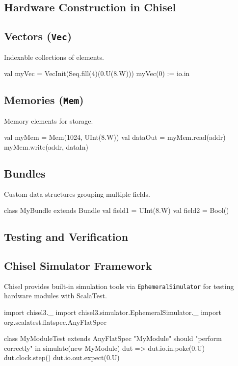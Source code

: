 \subsection{Hardware Construction in Chisel}

\subsection{Vectors (\texttt{Vec})}
Indexable collections of elements.
\begin{chiselcode}
val myVec = VecInit(Seq.fill(4)(0.U(8.W)))
myVec(0) := io.in
\end{chiselcode}

\subsection{Memories (\texttt{Mem})}
Memory elements for storage.
\begin{chiselcode}
val myMem = Mem(1024, UInt(8.W))
val dataOut = myMem.read(addr)
myMem.write(addr, dataIn)
\end{chiselcode}

\subsection{Bundles}
Custom data structures grouping multiple fields.
\begin{chiselcode}
class MyBundle extends Bundle {
  val field1 = UInt(8.W)
  val field2 = Bool()
}
\end{chiselcode}

\subsection{Testing and Verification}
\subsection{Chisel Simulator Framework}
Chisel provides built-in simulation tools via \texttt{EphemeralSimulator} for testing hardware modules with ScalaTest.
\begin{chiselcode}
import chisel3._
import chisel3.simulator.EphemeralSimulator._
import org.scalatest.flatspec.AnyFlatSpec

class MyModuleTest extends AnyFlatSpec {
  "MyModule" should "perform correctly" in {
    simulate(new MyModule) { dut =>
      dut.io.in.poke(0.U)
      dut.clock.step()
      dut.io.out.expect(0.U)
    }
  }
}
\end{chiselcode}

